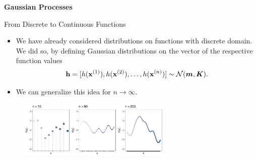 \begin{frame}[c]{}
\centering
\huge
\textbf{Gaussian Processes}
\end{frame}

\begin{frame}[c]{From Discrete to Continuous Functions}

\begin{itemize}
  \item We have already considered distributions on functions with discrete domain. We did so, by defining Gaussian distributions on the vector of the respective function values $$\mathbf{h} = [h(\mathbf{x}^{(1)}), h(\mathbf{x}^{(2)}),\dots, h(\mathbf{x}^{(n)})] \sim \mathcal{N}(\bm{m}, \bm{K}).$$
  \item We can generalize this idea for $n \to \infty$.
\end{itemize}

\begin{figure}
    \includegraphics[width = 0.65\textwidth]{figure_man/discrete/example_limit.pdf}
  \end{figure}
\end{frame}


